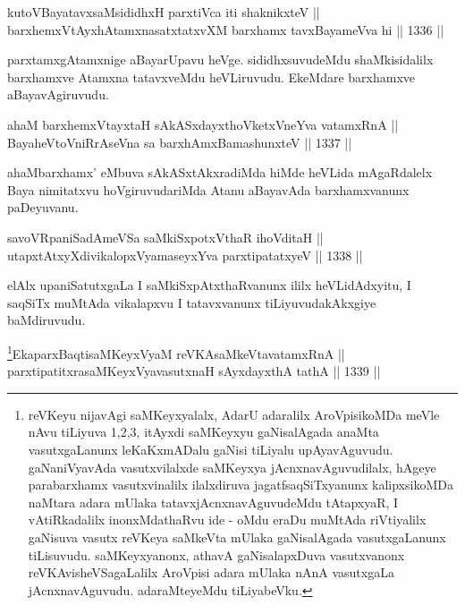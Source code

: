 \begin{shl}
kutoV\s BayatavxsaMsididhxH parxtiVca iti shaknikxteV || \\
barxhemxVtAyxhA\s \s tamxnasatxtatxvXM barxhamx tavxBayameVva hi \hfill || 1336 ||  
\end{shl}

\begin{artha}
parxtamxgAtamxnige aBayarUpavu heVge. sididhxsuvudeMdu shaMkisidalilx barxhamxve Atamxna tatavxveMdu heVLiruvudu. EkeMdare barxhamxve aBayavAgiruvudu.
\end{artha}

\begin{shl}
ahaM barxhemxVtayxtaH sAkASxdayxthoVketxVneYva vatamxRnA  || \\
BayaheVtoVniRrAseVna sa barxhAmxBamashunxteV \hfill || 1337 ||  
\end{shl}

\begin{artha}
ahaMbarxhamx' eMbuva sAkASxtAkxradiMda hiMde heVLida mAgaRdalelx Baya nimitatxvu hoVgiruvudariMda Atanu aBayavAda barxhamxvanunx paDeyuvanu.
\end{artha}


\begin{shl}
savoVRpaniSadAmeVSa saMkiSxpotxV\s thaR ihoVditaH || \\
utapxtAtxyXdivikalopxV\s yamaseyxYva parxtipatatxyeV \hfill || 1338 ||  
\end{shl}

\begin{artha}
elAlx upaniSatutxgaLa I saMkiSxpAtxthaRvanunx ililx heVLidAdxyitu, I saqSiTx muMtAda vikalapxvu I tatavxvanunx tiLiyuvudakAkxgiye baMdiruvudu.
\end{artha}



\begin{shl}
\footnote{reVKeyu nijavAgi saMKeyxyalalx, AdarU adaralilx AroVpisikoMDa meVle nAvu tiLiyuva 1,2,3, itAyxdi saMKeyxyu gaNisalAgada anaMta vasutxgaLanunx leKaKxmADalu gaNisi tiLiyalu upAyavAguvudu. gaNaniVyavAda vasutxvilalxde saMKeyxya jAcnxnavAguvudilalx, hAgeye parabarxhamx vasutxvinalilx ilalxdiruva jagatfsaqSiTxyanunx kalipxsikoMDa naMtara adara mUlaka tatavxjAcnxnavAguvudeMdu tAtapxyaR, I vAtiRkadalilx inonxMdathaRvu ide - oMdu eraDu muMtAda riVtiyalilx gaNisuva vasutx reVKeya saMkeVta mUlaka gaNisalAgada vasutxgaLanunx tiLisuvudu. saMKeyxyanonx, athavA gaNisalapxDuva vasutxvanonx reVKAvisheVSagaLalilx AroVpisi adara mUlaka nAnA vasutxgaLa jAcnxnavAguvudu. adaraMteyeMdu tiLiyabeVku.}EkaparxBaqtisaMKeyxVyaM reVKAsaMkeVtavatamxRnA || \\
parxtipatitxrasaMKeyxVyavasutxnaH sAyxdayxthA tathA \hfill || 1339 ||  
\end{shl}
				
